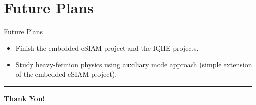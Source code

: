 \documentclass[11pt,aspectratio=169]{beamer}
\begin{document}
\section{Future Plans}

\begin{frame}{Future Plans}
	\begin{itemize}
		\item Finish the embedded eSIAM project and the IQHE projects.
		\item Study heavy-fermion physics using auxiliary mode approach (simple extension of the embedded eSIAM project).
	\end{itemize}

	\vspace*{\fill}

	\hrule

	\vspace*{\fill}
	\Large{\bf Thank You!}
\end{frame}
\end{document}
